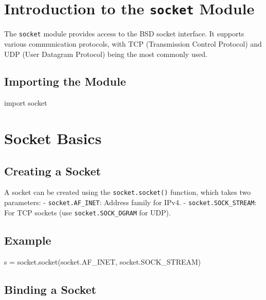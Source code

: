 \documentclass[
  letterpaper,
  DIV=11,
  numbers=noendperiod]{scrreprt}
\newenvironment{Shaded}{\begin{snugshade}}{\end{snugshade}}
\newcommand{\ImportTok}[1]{\textcolor[rgb]{0.00,0.46,0.62}{#1}}
\newcommand{\NormalTok}[1]{\textcolor[rgb]{0.00,0.23,0.31}{#1}}
\newcommand{\OperatorTok}[1]{\textcolor[rgb]{0.37,0.37,0.37}{#1}}
\begin{document}
\section{\texorpdfstring{Introduction to the \texttt{socket}
Module}{Introduction to the socket Module}}\label{introduction-to-the-socket-module}

The \texttt{socket} module provides access to the BSD socket interface.
It supports various communication protocols, with TCP (Transmission
Control Protocol) and UDP (User Datagram Protocol) being the most
commonly used.

\subsection{Importing the Module}\label{importing-the-module}

\begin{Shaded}
\begin{Highlighting}[]
\ImportTok{import}\NormalTok{ socket}
\end{Highlighting}
\end{Shaded}

\section{Socket Basics}\label{socket-basics}

\subsection{Creating a Socket}\label{creating-a-socket-1}

A socket can be created using the \texttt{socket.socket()} function,
which takes two parameters: - \texttt{socket.AF\_INET}: Address family
for IPv4. - \texttt{socket.SOCK\_STREAM}: For TCP sockets (use
\texttt{socket.SOCK\_DGRAM} for UDP).

\subsection{Example}\label{example-71}

\begin{Shaded}
\begin{Highlighting}[]
\NormalTok{s }\OperatorTok{=}\NormalTok{ socket.socket(socket.AF\_INET, socket.SOCK\_STREAM)}
\end{Highlighting}
\end{Shaded}

\subsection{Binding a Socket}\label{binding-a-socket}
\end{document}

